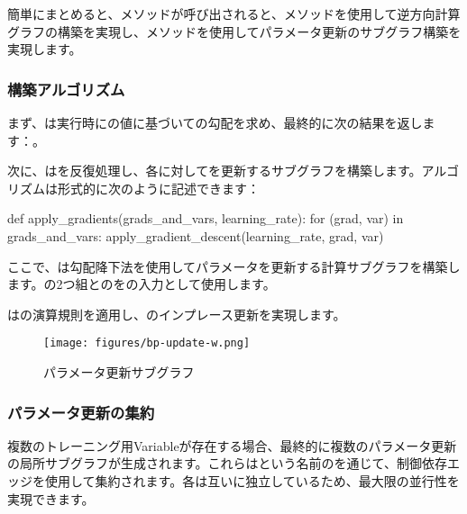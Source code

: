 \begin{content}
簡単にまとめると、メソッドが呼び出されると、メソッドを使用して逆方向計算グラフの構築を実現し、メソッドを使用してパラメータ更新のサブグラフ構築を実現します。

\subsubsection{構築アルゴリズム}

まず、は実行時にの値に基づいての勾配を求め、最終的に次の結果を返します：。

次に、はを反復処理し、各に対してを更新するサブグラフを構築します。アルゴリズムは形式的に次のように記述できます：

\begin{leftbar}
\begin{python}
def apply_gradients(grads_and_vars, learning_rate):
  for (grad, var) in grads_and_vars:
    apply_gradient_descent(learning_rate, grad, var)
\end{python}
\end{leftbar}

ここで、は勾配降下法を使用してパラメータを更新する計算サブグラフを構築します。の2つ組とのをの入力として使用します。

はの演算規則を適用し、のインプレース更新を実現します。

\begin{figure}[!h]
\centering
\texttt{[image: figures/bp-update-w.png]}
\caption{パラメータ更新サブグラフ}
 \label{fig:bp-update-w}
\end{figure}

\subsubsection{パラメータ更新の集約}

複数のトレーニング用Variableが存在する場合、最終的に複数のパラメータ更新の局所サブグラフが生成されます。これらはという名前のを通じて、制御依存エッジを使用して集約されます。各は互いに独立しているため、最大限の並行性を実現できます。


\end{content}
